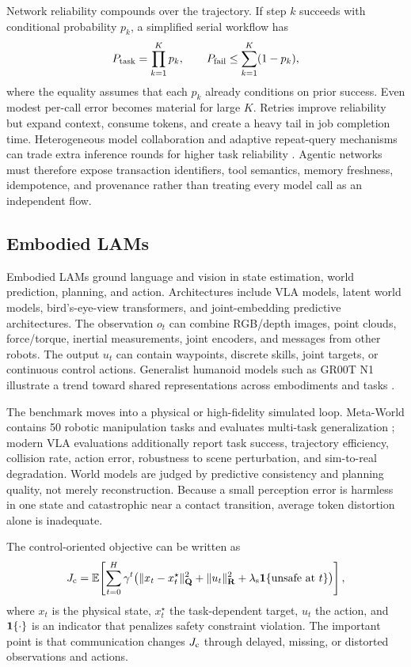 \documentclass[letterpaper,journal]{IEEEtran}
\begin{document}
Network reliability compounds over the trajectory. If step $k$ succeeds with
conditional probability $p_k$, a simplified serial workflow has
\begin{equation}
P_{\rm task}=\prod_{k=1}^{K}p_k,\qquad
P_{\rm fail}\leq\sum_{k=1}^{K}(1-p_k),
\label{eq:agent_reliability}
\end{equation}
where the equality assumes that each $p_k$ already conditions on prior
success. Even modest per-call error becomes material for large $K$.
Retries improve reliability but expand context, consume tokens, and create a
heavy tail in job completion time. Heterogeneous model collaboration and
adaptive repeat-query mechanisms can trade extra inference rounds for higher
task reliability \cite{garq}. Agentic networks must therefore expose
transaction identifiers, tool semantics, memory freshness, idempotence, and
provenance rather than treating every model call as an independent flow.

\subsection{Embodied LAMs}
Embodied LAMs ground language and vision in state estimation, world
prediction, planning, and action. Architectures include VLA models, latent
world models, bird's-eye-view transformers, and joint-embedding predictive
architectures. The observation $o_t$ can combine RGB/depth images, point
clouds, force/torque, inertial measurements, joint encoders, and messages from
other robots. The output $u_t$ can contain waypoints, discrete skills, joint
targets, or continuous control actions. Generalist humanoid models such as
GR00T N1 illustrate a trend toward shared representations across embodiments
and tasks \cite{groot}.

The benchmark moves into a physical or high-fidelity simulated loop.
Meta-World contains 50 robotic manipulation tasks and evaluates multi-task
generalization \cite{metaworld}; modern VLA evaluations additionally report
task success, trajectory efficiency, collision rate, action error, robustness
to scene perturbation, and sim-to-real degradation. World models are judged
by predictive consistency and planning quality, not merely reconstruction.
Because a small perception error is harmless in one state and catastrophic
near a contact transition, average token distortion alone is inadequate.

The control-oriented objective can be written as
\begin{equation}
J_{\rm c}=\mathbb{E}\!\left[\sum_{t=0}^{H}
\gamma^t\!\left(
\|x_t-x_t^\star\|_{\mathbf Q}^{2}
+\|u_t\|_{\mathbf R}^{2}
+\lambda_{\rm s}{\bf 1}\{\text{unsafe at }t\}
\right)\right],
\label{eq:control_cost}
\end{equation}
where $x_t$ is the physical state, $x_t^\star$ the task-dependent target,
$u_t$ the action, and ${\bf 1}\{\cdot\}$ is an indicator that penalizes safety
constraint violation. The important point is that communication changes
$J_{\rm c}$ through delayed, missing, or distorted observations and actions.
\end{document}
